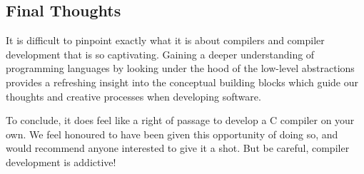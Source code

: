 
\subsection{Final Thoughts}
\label{sec:final_thoughts}

It is difficult to pinpoint exactly what it is about compilers and compiler development that is so captivating. Gaining a deeper understanding of programming languages by looking under the hood of the low-level abstractions provides a refreshing insight into the conceptual building blocks which guide our thoughts and creative processes when developing software.

To conclude, it does feel like a right of passage to develop a C compiler on your own. We feel honoured to have been given this opportunity of doing so, and would recommend anyone interested to give it a shot. But be careful, compiler development is addictive!
